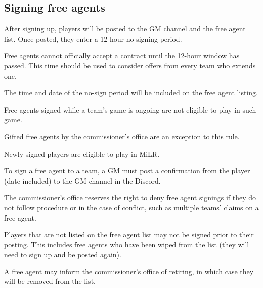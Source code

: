 \subsection{Signing free agents}
\begin{deepEnumerate}
	\item After signing up, players will be posted to the GM channel and the free agent list.
	Once posted, they enter a 12-hour no-signing period.
	\begin{deepEnumerate}
		\item Free agents cannot officially accept a contract until the 12-hour window has passed.
		This time should be used to consider offers from every team who extends one.
		\item The time and date of the no-sign period will be included on the free agent listing.
	\end{deepEnumerate}
	\item Free agents signed while a team's game is ongoing are not eligible to play in such game.
	\begin{deepEnumerate}
		\item Gifted free agents by the commissioner’s office are an exception to this rule.
		\item Newly signed players are eligible to play in MiLR.
	\end{deepEnumerate}
	\item To sign a free agent to a team, a GM must post a confirmation from the player
	(date included) to the GM channel in the Discord.
	\item The commissioner’s office reserves the right to deny free agent signings
	if they do not follow procedure or in the case of conflict,
	such as multiple teams' claims on a free agent.
	\item Players that are not listed on the free agent list may not be signed prior to their posting.
	This includes free agents who have been wiped from the list
	(they will need to sign up and be posted again).
	\item A free agent may inform the commissioner’s office of retiring,
	in which case they will be removed from the list.
\end{deepEnumerate}


